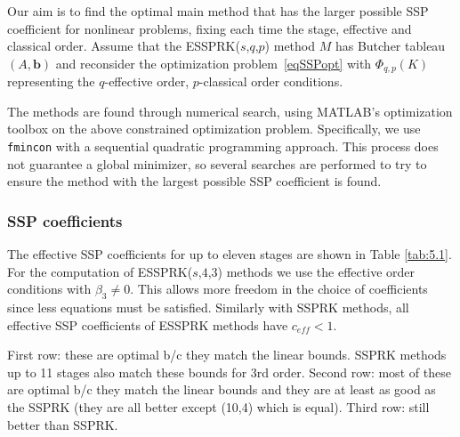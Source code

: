 \qquad Our aim is to find the optimal main method that has the larger possible SSP coefficient for nonlinear problems, fixing each time the stage, effective and classical order. 
Assume that the ESSPRK(\( s \),\( q \),\( p \)) method \( M \) has Butcher tableau  \( (A, \bm{b}) \)
and reconsider the optimization problem~\eqref{eqSSPopt}
with \( \Phi_{q,p}(K) \) representing  the \( q \)-effective order, \( p \)-classical order conditions.

The methods are found through numerical search, using
\textsc{MATLAB}'s optimization toolbox on the above constrained
optimization problem.  Specifically, we use \verb"fmincon" with a
sequential quadratic programming approach.
This process does not guarantee a global minimizer, so several
searches are performed to try to ensure the method with the largest possible SSP coefficient is found.


\subsubsection{SSP coefficients}\label{subsection3.1.2}

The effective SSP coefficients for up to eleven stages are shown in Table \ref{tab:5.1}. For the computation of ESSPRK(\( s \),\( 4 \),\( 3 \)) methods we use the effective order conditions with \( \beta_{3} \neq 0 \). This allows more freedom in the choice of coefficients since less equations must be satisfied. Similarly with SSPRK methods, all effective SSP coefficients of ESSPRK methods have \( c_{ef\!f} < 1 \).

First row: these are optimal b/c they match the linear bounds.  SSPRK methods up to 11 stages also match these bounds for 3rd order.  Second row: most of these are optimal b/c they match the linear bounds and they are at least as good as the SSPRK (they are all better except (10,4) which is equal).  Third row: still better than SSPRK.

